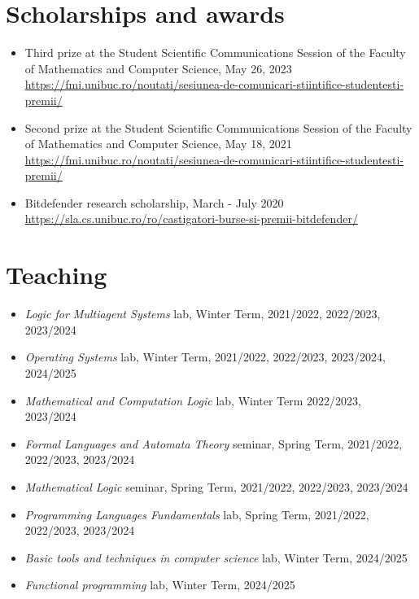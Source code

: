 \documentclass[letterpaper,11pt,oneside]{article}
\begin{document}
\section{Scholarships and awards} 
\normalsize
\begin{itemize}
    \item Third prize at the Student Scientific Communications Session of the Faculty of Mathematics and Computer Science, May 26, 2023 \\ 
    \url{https://fmi.unibuc.ro/noutati/sesiunea-de-comunicari-stiintifice-studentesti-premii/}
    \item Second prize at the Student Scientific Communications Session of the Faculty of Mathematics and Computer Science, May 18, 2021 \\ 
    \url{https://fmi.unibuc.ro/noutati/sesiunea-de-comunicari-stiintifice-studentesti-premii/}
    \item Bitdefender research scholarship, March - July 2020 \\
    \url{https://sla.cs.unibuc.ro/ro/castigatori-burse-si-premii-bitdefender/}
\end{itemize}
\mbox{}



\noindent
\section{Teaching}
\normalsize
\begin{itemize}
    \item \textit{Logic for Multiagent Systems} lab, Winter Term, 2021/2022, 2022/2023, 2023/2024
    \item \textit{Operating Systems} lab, Winter Term, 2021/2022, 2022/2023, 2023/2024, 2024/2025
    \item \textit{Mathematical and Computation Logic} lab, Winter Term 2022/2023, 2023/2024
    \item \textit{Formal Languages and Automata Theory} seminar, Spring Term, 2021/2022, 2022/2023, 2023/2024 
    \item \textit{Mathematical Logic} seminar, Spring Term, 2021/2022, 2022/2023, 2023/2024 
    \item \textit{Programming Languages Fundamentals} lab, Spring Term, 2021/2022, 2022/2023, 2023/2024 
    \item \textit{Basic tools and techniques in computer science} lab, Winter Term, 2024/2025 
    \item \textit{Functional programming} lab, Winter Term, 2024/2025
\end{itemize}
\mbox{}
\end{document}
